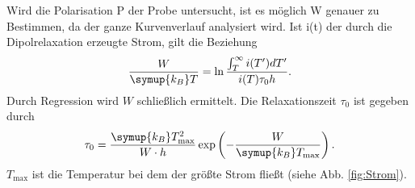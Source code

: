 Wird die Polarisation P der Probe untersucht, ist es möglich W genauer zu Bestimmen, da der ganze Kurvenverlauf analysiert wird.
Ist i(t) der durch die Dipolrelaxation erzeugte Strom, gilt die Beziehung
\begin{equation}
    \frac{W}{\symup{k_B}T}=\ln\frac{\int_T^\infty i(T')dT'}{i(T)\tau_0 h}.
\end{equation}
Durch Regression wird $W$ schließlich ermittelt.
Die Relaxationszeit $\tau_0$ ist gegeben durch
\begin{equation}
    \label{eqn:tau0}
    \tau_0 = \frac{\symup{k_B}T_\text{max}^2}{W \cdot h} \exp\left(-\frac{W}{\symup{k_B}T_\text{max}} \right).
\end{equation}
$T_\text{max}$ ist die Temperatur bei dem der größte Strom fließt (siehe Abb. \ref{fig:Strom}). 


\FloatBarrier